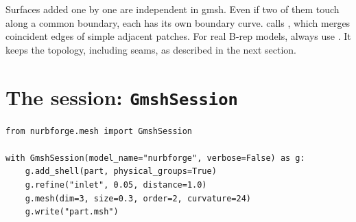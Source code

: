\begin{note}
Surfaces added one by one are independent in gmsh. Even if two of them touch along a common
boundary, each has its own boundary curve.  calls
, which merges coincident edges of simple adjacent patches. For
real B-rep models, always use . It keeps the topology, including seams, as
described in the next section.
\end{note}

\section{The session: \texttt{GmshSession}}\label{sec:mesh-session}

\begin{lstlisting}[style=python]
from nurbforge.mesh import GmshSession

with GmshSession(model_name="nurbforge", verbose=False) as g:
    g.add_shell(part, physical_groups=True)
    g.refine("inlet", 0.05, distance=1.0)
    g.mesh(dim=3, size=0.3, order=2, curvature=24)
    g.write("part.msh")
\end{lstlisting}


